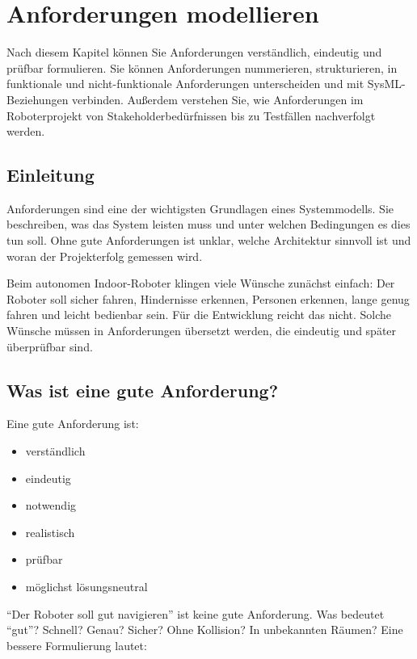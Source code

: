\chapter{Anforderungen modellieren}

\begin{lernziele}
Nach diesem Kapitel können Sie Anforderungen verständlich, eindeutig und prüfbar formulieren. Sie können Anforderungen nummerieren, strukturieren, in funktionale und nicht-funktionale Anforderungen unterscheiden und mit SysML-Beziehungen verbinden. Außerdem verstehen Sie, wie Anforderungen im Roboterprojekt von Stakeholderbedürfnissen bis zu Testfällen nachverfolgt werden.
\end{lernziele}

\section{Einleitung}
Anforderungen sind eine der wichtigsten Grundlagen eines Systemmodells. Sie beschreiben, was das System leisten muss und unter welchen Bedingungen es dies tun soll. Ohne gute Anforderungen ist unklar, welche Architektur sinnvoll ist und woran der Projekterfolg gemessen wird.

Beim autonomen Indoor-Roboter klingen viele Wünsche zunächst einfach: Der Roboter soll sicher fahren, Hindernisse erkennen, Personen erkennen, lange genug fahren und leicht bedienbar sein. Für die Entwicklung reicht das nicht. Solche Wünsche müssen in Anforderungen übersetzt werden, die eindeutig und später überprüfbar sind.

\section{Was ist eine gute Anforderung?}
Eine gute Anforderung ist:

\begin{itemize}
    \item verständlich
    \item eindeutig
    \item notwendig
    \item realistisch
    \item prüfbar
    \item möglichst lösungsneutral
\end{itemize}

\enquote{Der Roboter soll gut navigieren} ist keine gute Anforderung. Was bedeutet \enquote{gut}? Schnell? Genau? Sicher? Ohne Kollision? In unbekannten Räumen? Eine bessere Formulierung lautet:

